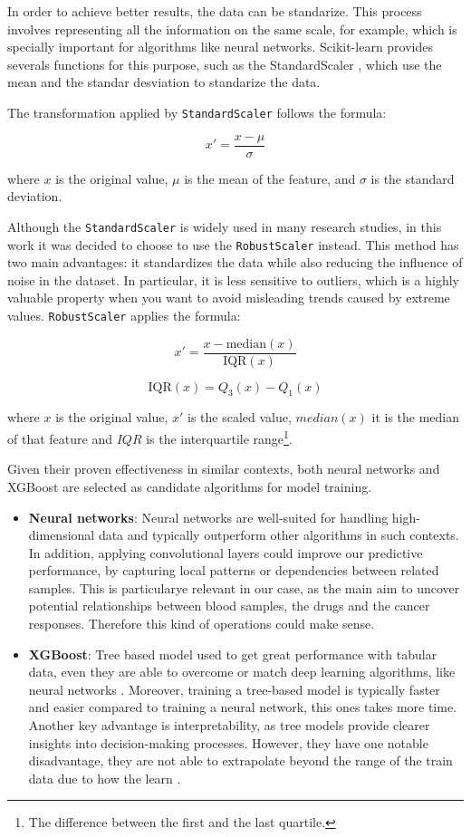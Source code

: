 In order to achieve better results, the data can be standarize. This process involves representing all the information on the same scale, for example, which is specially important for algorithms like neural networks. Scikit-learn provides severals functions for this purpose, such as the StandardScaler \cite{scikit-learn-standardscaler}, which use the mean and the standar desviation to standarize the data.

The transformation applied by \texttt{StandardScaler} follows the formula:

\[
x' = \frac{x - \mu}{\sigma}
\]

where \( x \) is the original value, \( \mu \) is the mean of the feature, and \( \sigma \) is the standard deviation.

Although the \texttt{StandardScaler} is widely used in many research studies, in this work it was decided to choose to use the \texttt{RobustScaler} \cite{scikit-learn-robustscaler} instead. This method has two main advantages: it standardizes the data while also reducing the influence of noise in the dataset. In particular, it is less sensitive to outliers, which is a highly valuable property when you want to avoid misleading trends caused by extreme values. \texttt{RobustScaler} applies the formula:

\[
x' = \frac{x - \text{median}(x)}{\text{IQR}(x)}
\]

\[
\text{IQR}(x) = Q_3(x) - Q_1(x)
\]

where \(x\) is the original value, \(x'\) is the scaled value, \(median(x)\) it is the median of that feature and \(IQR\) is the interquartile range\footnote{The difference between the first and the last quartile.}. 

Given their proven effectiveness in similar contexts, both neural networks and XGBoost are selected as candidate algorithms for model training.
\begin{itemize}
    \item \textbf{Neural networks}: Neural networks are well-suited for handling high-dimensional data and typically outperform other algorithms in such contexts. In addition, applying convolutional layers could improve our predictive performance, by capturing local patterns or dependencies between related samples. This is particularye relevant in our case, as the main aim to uncover potential relationships between blood samples, the drugs and the cancer responses. Therefore this kind of operations could make sense. 
    \item \textbf{XGBoost}: Tree based model used to get great performance with tabular data, even they are able to overcome or match deep learning algorithms, like neural networks \cite{treesOverNets}. Moreover, training a tree-based model is typically faster and easier compared to training a neural network, this ones takes more time. Another key advantage is interpretability, as tree models provide clearer insights into decision-making processes. However, they have one notable disadvantage, they are not able to extrapolate beyond the range of the train data due to how the learn \cite{treesLimitations}.
\end{itemize}

